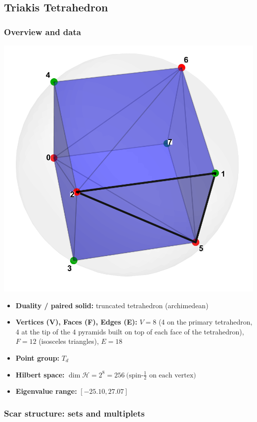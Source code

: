\documentclass[11pt,a4paper]{article}
\begin{document}
\subsection*{Triakis Tetrahedron}

\subsubsection*{Overview and data}
\begin{center}
  \includegraphics[width=.6\linewidth]{triakistetrahedron}
\end{center}

\begin{itemize}[leftmargin=1.5em]
  \item \textbf{Duality / paired solid:} truncated tetrahedron (archimedean)
  \item \textbf{Vertices (V), Faces (F), Edges (E):} $V = 8$ (4 on the primary tetrahedron, 4 at the tip of the 4 pyramids built on top of each face of the tetrahedron),\; $F = 12$ (isosceles triangles),\; $E = 18$
  \item \textbf{Point group:} $T_d$
  \item \textbf{Hilbert space:} \(
        \dim\mathcal{H} = 2^{8} = 256\ \text{(spin-$\tfrac12$ on each vertex)}
        \)
  \item \textbf{Eigenvalue range:} $[-25.10, 27.07]$
\end{itemize}

\subsubsection*{Scar structure: sets and multiplets}
\end{document}
